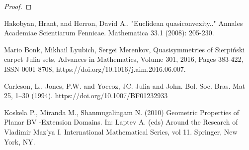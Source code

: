 \begin{proof}
\begin{comment}
\textbf{Claim. }The Cauliflower is bounded.

\textbf{Proof. }As in the hyperbolic case.$\square$

Using claim 1, fix $R>0$ for which $B(0,R)\supset K$. Denote $B=B(0,R)$.

Let $\zeta\in J$. Our goal is to show that $\zeta$ is accessible.

This is immediately equaivalent to showing that there is a rectifiable
curve $\Gamma$ starting at $\zeta$ that exits $B$.

The basic strategy will be to investigate the geometry near the main
cusp $p=\frac{1}{4}$, since all other cusps are preimages of $p$
under $f$,

whence the principle of the conformal elevator reduces the general
case to the case of a point sufficiently close to the main cusp $p$.

To implement this strategy, we take some arbitrary other point on
the Julia set, connect it by a curve $\gamma$ to $a$, then consider
all preimages of $\gamma$.

In general, consecutive images near a parabolic point have consecutive
distances comparable to $\frac{1}{n^{2}}$ , where $n$ is the index
of the preimage.
\end{comment}
\end{proof}
\begin{thebibliography}{1}
Hakobyan, Hrant, and Herron, David A.. "Euclidean
quasiconvexity.."{} Annales Academiae Scientiarum Fennicae.
Mathematica 33.1 (2008): 205-230.

Mario Bonk, Mikhail Lyubich, Sergei Merenkov, Quasisymmetries
of Sierpiński carpet Julia sets, Advances in Mathematics, Volume 301,
2016, Pages 383-422, ISSN 0001-8708, https://doi.org/10.1016/j.aim.2016.06.007.

Carleson, L., Jones, P.W. and Yoccoz, JC. Julia and John. Bol. Soc. Bras. Mat 25, 1–30 (1994). https://doi.org/10.1007/BF01232933

Koskela P., Miranda M., Shanmugalingam N. (2010) Geometric Properties of Planar BV -Extension Domains. In: Laptev A. (eds) Around the Research of Vladimir Maz'ya I. International Mathematical Series, vol 11. Springer, New York, NY. 
\end{thebibliography}


